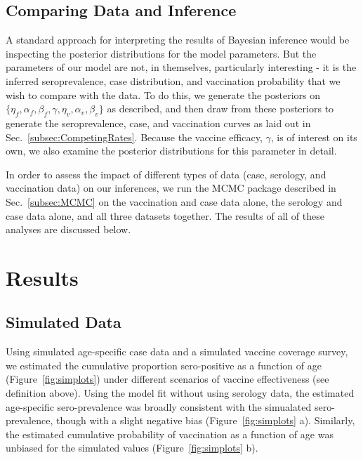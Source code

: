 \documentclass[nofootinbib,aps,pre,twocolumn,superscriptaddress,showkeys,showpacs]{revtex4-1}
\begin{document}
\subsection{Comparing Data and Inference \label{subsec:Comp}}
A standard approach for interpreting the results of Bayesian inference would be inspecting the posterior distributions for the model parameters. But the parameters of our model are not, in themselves, particularly interesting - it is the inferred seroprevalence, case distribution, and vaccination probability that we wish to compare with the data. To do this, we generate the posteriors on $\{\eta_f, \alpha_f, \beta_f, \gamma, \eta_v, \alpha_v, \beta_v\}$ as described, and then draw from these posteriors to generate the seroprevalence, case, and vaccination curves as laid out in Sec.~\ref{subsec:CompetingRates}. Because the vaccine efficacy, $\gamma$, is of interest on its own, we also examine the posterior distributions for this parameter in detail.

In order to assess the impact of different types of data (case, serology, and vaccination data) on our inferences, we run the MCMC package described in Sec.~\ref{subsec:MCMC} on the vaccination and case data alone, the serology and case data alone, and all three datasets together. The results of all of these analyses are discussed below.

\section{Results \label{sec:Results}}
\subsection{Simulated Data \label{subsec:SimDat}}

Using simulated age-specific case data and a simulated vaccine coverage survey, we estimated the cumulative proportion sero-positive as a function of age (Figure~\ref{fig:simplots}) under different scenarios of vaccine effectiveness (see definition above).  Using the model fit without using serology data, the estimated age-specific sero-prevalence was broadly consistent with the simualated sero-prevalence, though with a slight negative bias (Figure~\ref{fig:simplots} a). Similarly, the estimated cumulative probability of vaccination as a function of age was unbiased for the simulated values (Figure~\ref{fig:simplots} b).
\end{document}
